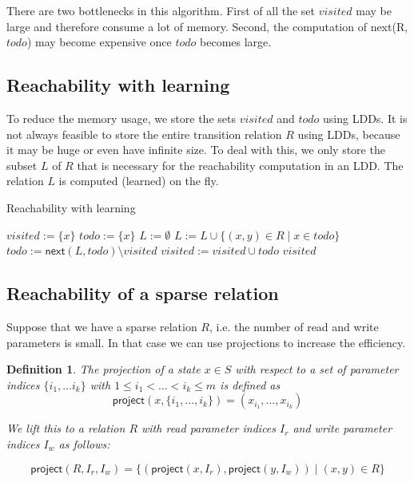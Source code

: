 \documentclass{article}
\newtheorem{definition}[theorem]{Definition}
\newcommand{\var}[1]{\ensuremath{\textit{#1}}}
\begin{document}
\noindent
There are two bottlenecks in this algorithm. First of all the set \var{visited} may be large and therefore consume a lot of memory. Second, the computation of \textsf{next}(R, \var{todo}) may become 
expensive once \var{todo} becomes large.

\subsection{Reachability with learning}
To reduce the memory usage, we store the sets $visited$ and $todo$ using LDDs. It is not always feasible to store the entire transition relation $R$ using LDDs, because it may be huge or even have infinite size. To deal with this, we only store the subset $L$ of $R$ that is necessary for the reachability computation in an LDD. The relation $L$ is computed (learned) on the fly.

\begin{algorithm}[ht]
\caption{Reachability with learning}
\label{alg:reachability}
\begin{algorithmic}[1]
\State $\var{visited} := \{ x \}$
\State $\var{todo} := \{ x \}$
\State $L := \emptyset$ 
\While {$\var{todo} \neq \emptyset$}
    \State $L := L \cup \{ (x,y) \in R \mid x \in \var{todo} \} $ 
    \State $\var{todo} := \textsf{next}(L, \var{todo}) \setminus \var{visited}$ 
    \State $\var{visited} := \var{visited} \cup \var{todo}$
\EndWhile
\State \Return \var{visited}
\EndFunction
\end{algorithmic}
\end{algorithm}

\newpage
\subsection{Reachability of a sparse relation}

Suppose that we have a sparse relation $R$, i.e. the number of read and write parameters is small. In that case we can use projections to increase the efficiency. \\

\begin{definition}
The projection of a state $x \in S$ with respect to a set of parameter indices $\{ i_1, \ldots i_k \}$ with $1 \leq i_1 < \ldots < i_k \leq m$ is defined as
\[
\textsf{project}(x, \{ i_1, \ldots, i_k \} ) = (x_{i_1}, \ldots, x_{i_k})
\]

\noindent
We lift this to a relation $R$ with read parameter indices $I_r$ and write parameter indices $I_w$ as follows:

\[
\textsf{project}(R, I_r, I_w) = \{ (\textsf{project}(x,I_r), \textsf{project}(y,I_w)) \mid (x,y) \in R \}
\]
\end{definition}
\end{document}
